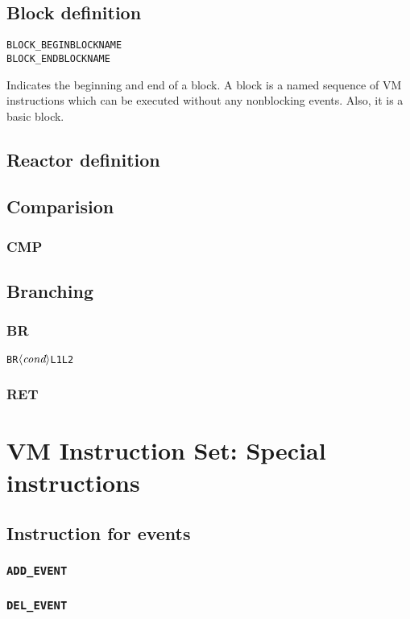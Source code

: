 \documentclass{note}
\newcommand{\rtt}[1]{\textcolor{red2}{\texttt{#1}}}
\begin{document}
\subsection{Block definition}
\begin{alltt}
  BLOCK_BEGIN BLOCKNAME
  BLOCK_END BLOCKNAME
\end{alltt}
Indicates the beginning and end of a block. A block is a named sequence of VM
instructions which can be executed without any nonblocking events.
Also, it is a basic block.


\subsection{Reactor definition}

\subsection{Comparision}
\subsubsection{CMP}

\subsection{Branching}
\subsubsection{BR}
\begin{alltt}
  BR $\arc{cond}$ L1 L2
\end{alltt}
\subsubsection{RET}

\section{VM Instruction Set: Special instructions}

\subsection{Instruction for events}
\subsubsection{\rtt{ADD\_EVENT}}
\subsubsection{\rtt{DEL\_EVENT}}
\end{document}
